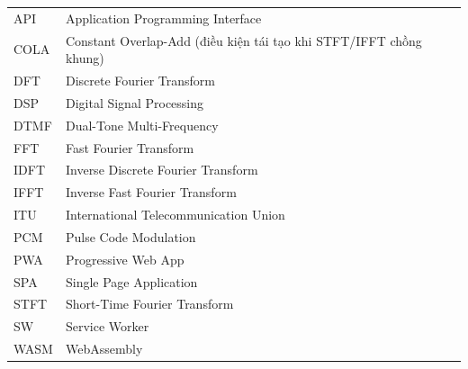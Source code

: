 \begin{table}[h!]
	\centering
	\begin{tabular}{ll}
		API     & Application Programming Interface \\
		COLA    & Constant Overlap-Add (điều kiện tái tạo khi STFT/IFFT chồng khung) \\
		DFT     & Discrete Fourier Transform \\
		DSP     & Digital Signal Processing \\
		DTMF    & Dual-Tone Multi-Frequency \\
		FFT     & Fast Fourier Transform \\
		IDFT    & Inverse Discrete Fourier Transform \\
		IFFT    & Inverse Fast Fourier Transform \\
		ITU     & International Telecommunication Union \\
		PCM     & Pulse Code Modulation \\
		PWA     & Progressive Web App \\
		SPA     & Single Page Application \\
		STFT    & Short-Time Fourier Transform \\
		SW      & Service Worker \\
		WASM    & WebAssembly \\
	\end{tabular}
\end{table}
